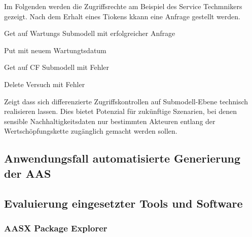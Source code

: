 Im Folgenden werden die Zugriffsrechte am Beispiel des Service Techmnikers gezeigt.
Nach dem Erhalt eines Tiokens kkann eine Anfrage gestellt werden.

Get auf Wartungs Submodell mit erfolgreicher Anfrage 

Put mit neuem Wartungtsdatum

Get auf CF Submodell mit Fehler

Delete Versuch mit Fehler


Zeigt dass sich differenzierte Zugriffskontrollen auf Submodell-Ebene technisch realisieren lassen. 
Dies bietet Potenzial für zukünftige Szenarien, bei denen sensible Nachhaltigkeitsdaten nur bestimmten Akteuren entlang der Wertschöpfungskette zugänglich gemacht werden sollen.

\subsection{Anwendungsfall automatisierte Generierung der AAS}

\subsection{Evaluierung eingesetzter Tools und Software}
\subsubsection{AASX Package Explorer}


